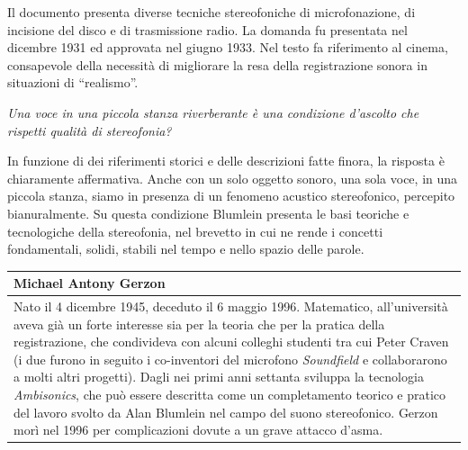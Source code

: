Il documento presenta diverse tecniche stereofoniche di microfonazione, di
incisione del disco e di trasmissione radio. La domanda fu presentata nel
dicembre 1931 ed approvata nel giugno 1933. Nel testo fa riferimento al cinema,
consapevole della necessità di migliorare la resa della registrazione sonora
in situazioni di “realismo”.

\emph{Una voce in una piccola stanza riverberante è una condizione d'ascolto che
rispetti qualità di stereofonia?}

In funzione di dei riferimenti storici e delle descrizioni fatte finora, la
risposta è chiaramente affermativa. Anche con un solo oggetto sonoro, una sola
voce, in una piccola stanza, siamo in presenza di un fenomeno acustico
stereofonico, percepito bianuralmente. Su questa condizione Blumlein presenta
le basi teoriche e tecnologiche della stereofonia, nel brevetto in cui ne
rende i concetti fondamentali, solidi, stabili nel tempo e nello spazio delle parole.


\vfill\null

\begin{table}[ht]
\footnotesize
\begin{tabular}{L{.969\textwidth}}%
\toprule
	\textbf{Michael Antony Gerzon}\\
\midrule
Nato il 4 dicembre 1945, deceduto il 6 maggio 1996. Matematico, all'università
aveva già un forte interesse sia per la teoria che per la pratica della
registrazione, che condivideva con alcuni colleghi studenti tra cui Peter Craven
(i due furono in seguito i co-inventori del microfono \emph{Soundfield} e
collaborarono a molti altri progetti). Dagli nei primi anni settanta sviluppa la
tecnologia \emph{Ambisonics}, che può essere descritta come un completamento teorico
e pratico del lavoro svolto da Alan Blumlein nel campo del suono stereofonico.
Gerzon morì nel 1996 per complicazioni dovute a un grave attacco d'asma. \\
\bottomrule
\end{tabular}
\end{table}
